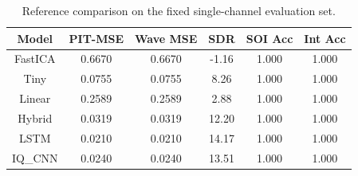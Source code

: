 \begin{table}[t]
\centering
\caption{Reference comparison on the fixed single-channel evaluation set.}
\label{tab:model_comparison_reference}
\begin{tabular}{|c|c|c|c|c|c|}
\hline
Model & PIT-MSE & Wave MSE & SDR & SOI Acc & Int Acc \\ 
\hline
FastICA & 0.6670 & 0.6670 & -1.16 & 1.000 & 1.000 \\ 
Tiny & 0.0755 & 0.0755 & 8.26 & 1.000 & 1.000 \\ 
Linear & 0.2589 & 0.2589 & 2.88 & 1.000 & 1.000 \\ 
Hybrid & 0.0319 & 0.0319 & 12.20 & 1.000 & 1.000 \\ 
LSTM & 0.0210 & 0.0210 & 14.17 & 1.000 & 1.000 \\ 
IQ\_CNN & 0.0240 & 0.0240 & 13.51 & 1.000 & 1.000 \\ 
\hline
\end{tabular}
\end{table}
